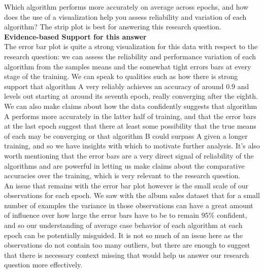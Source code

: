 Which algorithm performs more accurately on average across epochs, and how does the use of a visualization help you assess reliability and variation of each algorithm? The strip plot is best for answering this research question.\\

\textbf{Evidence-based Support for this answer}\\
The error bar plot is quite a strong visualization for this data with respect to the research question: we can assess the reliability and performance variation of each algorithm from the samples means and the somewhat tight errors bars at every stage of the training. We can speak to qualities such as how there is strong support that algorithm A very reliably achieves an accuracy of around 0.9 and levels out starting at around its seventh epoch, really converging after the eighth. We can also make claims about how the data confidently suggests that algorithm A performs more accurately in the latter half of training, and that the error bars at the last epoch suggest that there at least some possibility that the true means of each may be converging or that algorithm B could surpass A given a longer training, and so we have insights with which to motivate further analysis. It's also worth mentioning that the error bars are a very direct signal of reliability of the algorithms and are powerful in letting us make claims about the comparative accuracies over the training, which is very relevant to the research question.\\

An issue that remains with the error bar plot however is the small scale of our observations for each epoch. We saw with the album sales dataset that for a small number of examples the variance in those observations can have a great amount of influence over how large the error bars have to be to remain 95\% confident, and so our understanding of average case behavior of each algorithm at each epoch can be potentially misguided. It is not so much of an issue here as the observations do not contain too many outliers, but there are enough to suggest that there is necessary context missing that would help us answer our research question more effectively.\\

